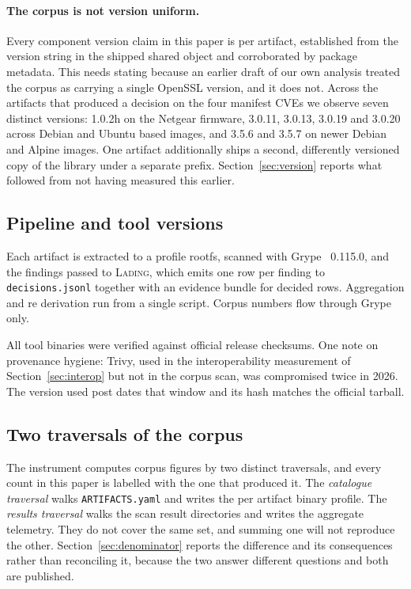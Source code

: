 \paragraph{The corpus is not version uniform.} Every component version claim in
this paper is per artifact, established from the version string in the shipped
shared object and corroborated by package metadata. This needs stating because
an earlier draft of our own analysis treated the corpus as carrying a single
OpenSSL version, and it does not. Across the artifacts that produced a decision
on the four manifest CVEs we observe seven distinct versions: 1.0.2h on the
Netgear firmware, 3.0.11, 3.0.13, 3.0.19 and 3.0.20 across Debian and Ubuntu
based images, and 3.5.6 and 3.5.7 on newer Debian and Alpine images. One
artifact additionally ships a second, differently versioned copy of the library
under a separate prefix. Section~\ref{sec:version} reports what followed from
not having measured this earlier.

\subsection{Pipeline and tool versions}

Each artifact is extracted to a profile rootfs, scanned with Grype~\cite{grype} 0.115.0, and
the findings passed to \textsc{Lading}, which emits one row per finding to
\texttt{decisions.jsonl} together with an evidence bundle for decided rows.
Aggregation and re derivation run from a single script. Corpus numbers flow
through Grype only.

All tool binaries were verified against official release checksums. One note on
provenance hygiene: Trivy, used in the interoperability measurement of
Section~\ref{sec:interop} but not in the corpus scan, was compromised twice in
2026. The version used post dates that window and its hash matches the official
tarball.

\subsection{Two traversals of the corpus}
\label{sec:traversals}

The instrument computes corpus figures by two distinct traversals, and every
count in this paper is labelled with the one that produced it. The
\emph{catalogue traversal} walks \texttt{ARTIFACTS.yaml} and writes the per
artifact binary profile. The \emph{results traversal} walks the scan result
directories and writes the aggregate telemetry. They do not cover the same set,
and summing one will not reproduce the other. Section~\ref{sec:denominator}
reports the difference and its consequences rather than reconciling it, because
the two answer different questions and both are published.

